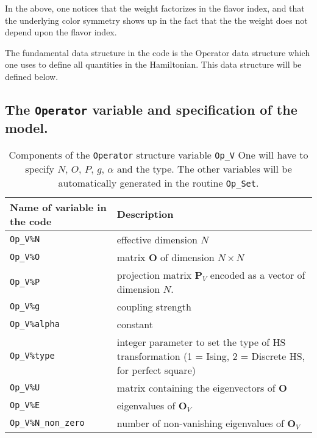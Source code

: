 In the above, one notices that the weight factorizes in  the flavor index,  and that  the underlying color symmetry shows up in the fact that the the weight  does not depend upon the flavor index. 


The fundamental data structure in the code is the Operator data structure   which one uses to define all quantities in the Hamiltonian.     This  data structure will be defined below.

\subsection{The \texttt{Operator} variable and specification of the model.}
\begin{table}[h]
   \begin{tabular}{l l}
    Name of variable in the code & Description \\\hline
    \texttt{Op\_V\%N}            &  effective dimension $N$ \\
    \texttt{Op\_V\%O}            &  matrix  $\mathbf{O}$  of dimension $N \times N$\\
    \texttt{Op\_V\%P}            &  projection matrix $\mathbf{P}_{V}$  encoded as a vector of dimension $N$.\\
     \texttt{Op\_V\%g}            &  coupling strength  \\  
    \texttt{Op\_V\%alpha}      &  constant \\
    \texttt{Op\_V\%type}        &  integer parameter to set the type of 
                                             HS transformation   (1 = Ising, 2 = Discrete HS, for perfect square)  \\ 
    \texttt{Op\_V\%U}            &  matrix containing the eigenvectors of $\mathbf{O}$  \\
    \texttt{Op\_V\%E}            &  eigenvalues of $\mathbf{O}_{V}$ \\
    \texttt{Op\_V\%N\_non\_zero} &  number of non-vanishing eigenvalues of $\mathbf{O}_{V}$ 
   \end{tabular}
   \caption{Components of the \texttt{Operator} structure variable \texttt{Op\_V}   One will have to specify $N$, $O$, $P$, $g$, $\alpha$ and the type.  The other variables will be automatically generated in the routine \texttt{Op\_Set}.  \label{Operator.type}}
\end{table}


